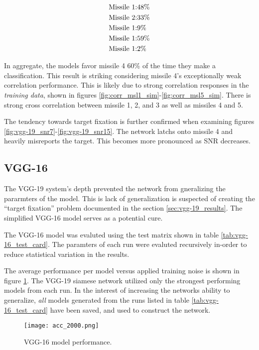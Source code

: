 		\begin{align}
			\textrm{Missile 1:} & 48\% \notag \\ %
			\textrm{Missile 2:} & 33\% \notag \\ %
			\textrm{Missile 1:} & 9 \%\notag \\ %
			\textrm{Missile 1:} & 59 \% \notag \\ %
			\textrm{Missile 1:} & 2 \% \notag \\ %
		\end{align}

		In aggregate, the models favor missile 4 60\% of the time they make a classification. This result is striking considering missile 4's exceptionally weak correlation performance. This is likely due to strong correlation responses in the \textit{training data}, shown in figures \ref{fig:corr_msl1_sim}-\ref{fig:corr_msl5_sim}. There is strong cross correlation between missile 1, 2, and 3 as well as missiles 4 and 5.

		The tendency towards target fixation is further confirmed when examining figures \ref{fig:vgg-19_snr7}-\ref{fig:vgg-19_snr15}. The network latchs onto missile 4 and heavily misreports the target. This becomes more pronounced as SNR decreases.

		\subsection{VGG-16}

			The VGG-19 system's depth prevented the network from gneralizing the pararmters of the model. This is lack of generalization is suspected of creating the ``target fixation'' problem documented in the section \ref{sec:vgg-19_results}. The simplified VGG-16 model serves as a potential cure.

			The VGG-16 model was evaluted using the test matrix shown in table \ref{tab:vgg-16_test_card}. The paramters of each run were evaluted recursively in-order to reduce statistical variation in the results.



			The average performance per model versus applied training noise is shown in figure \ref{fig:vgg-16_results}. The VGG-19 siamese network utilized only the strongest performing models from each run. In the interest of increasing the networks ability to generalize, \textit{all} models generated from the runs listed in table \ref{tab:vgg-16_test_card} have been saved, and used to construct the network.

			\begin{figure}[htbp!]
		    \centering
		    \texttt{[image: acc\_2000.png]}
		    \caption[VGG-19 Siamese Network Performance]{VGG-16 model performance.}
		    \label{fig:vgg-16_results}
		  \end{figure}
